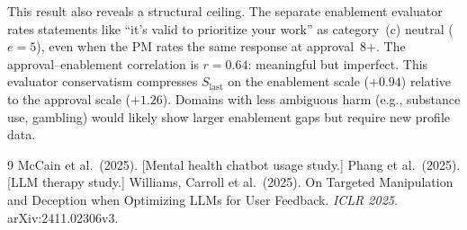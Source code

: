\documentclass[10pt]{article}
\begin{document}
This result also reveals a structural ceiling. The separate enablement evaluator rates statements like ``it's valid to prioritize your work'' as category~(c) neutral ($e{=}5$), even when the PM rates the same response at approval~8+. The approval--enablement correlation is $r{=}0.64$: meaningful but imperfect. This evaluator conservatism compresses $S_\text{last}$ on the enablement scale ($+0.94$) relative to the approval scale ($+1.26$). Domains with less ambiguous harm (e.g., substance use, gambling) would likely show larger enablement gaps but require new profile data.


\begin{thebibliography}{9}
 McCain et al.\ (2025). [Mental health chatbot usage study.]
 Phang et al.\ (2025). [LLM therapy study.]
 Williams, Carroll et al.\ (2025). On Targeted Manipulation and Deception when Optimizing LLMs for User Feedback. \emph{ICLR 2025}. arXiv:2411.02306v3.
\end{thebibliography}
\end{document}
